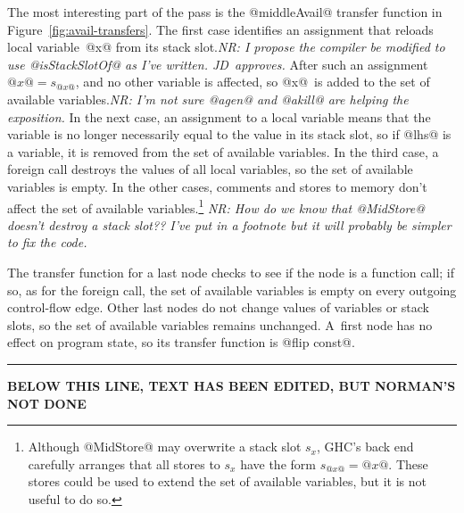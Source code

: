 \documentclass[blockstyle,preprint,nocopyrightspace]{sigplanconf}
\newcommand\slotof[1]{\ensuremath{s_{#1}}}
\newcommand{\authornote}[1]{{\em #1}}
\newcommand{\norman}[1]{\authornote{NR: #1}}
\let\remark\norman
\newcommand{\john}[1]{\authornote{JD: #1}}
\newcommand\figref[1]{Figure~\ref{fig:#1}}
\begin{document}



The most interesting part of the pass is the @middleAvail@ transfer
function in \figref{avail-transfers}.
The first case identifies an assignment that reloads local
variable~@x@ from its stack slot.\remark{I propose the compiler be
modified to use @isStackSlotOf@ as I've written. JD~approves.}
After such an assignment $@x@ = \slotof{@x@}$, and no other variable
is affected, so @x@~is added to the set of available
variables.\remark{I'm not sure @agen@ and 
@akill@ are helping the exposition.}
In the next case, an assignment to a local variable means that the
variable is no longer necessarily equal to the value in its stack
slot, so if @lhs@ is a variable, it is removed from the set of
available variables.
In the third case, a foreign call destroys the values of all local
variables, so the set of available variables is empty.
In the other cases, comments and stores to memory don't affect the set
of available variables.\footnote
{Although @MidStore@ may overwrite a stack slot \slotof x, GHC's back end
carefully arranges that all stores to \slotof x have the form
$\slotof{@x@}= @x@$.
These stores could be used to extend the set of available variables,
but it is not useful to do so.}
\remark{How do we know that @MidStore@ doesn't
destroy a stack slot??  I've put in a footnote but it will probably be
simpler to fix the code.}


The transfer function for a last node checks to see if the node is a
function call; if so, as for the foreign call, the set of
available variables is empty on every outgoing control-flow edge.
Other last nodes do not change values of variables or stack slots, 
so the set of available variables remains unchanged.
%
A~first node has no effect on program state, so its transfer function
is @flip const@.

\bigskip

\hrule

\textbf{BELOW THIS LINE, TEXT HAS BEEN EDITED, BUT NORMAN'S NOT DONE}
\end{document}
